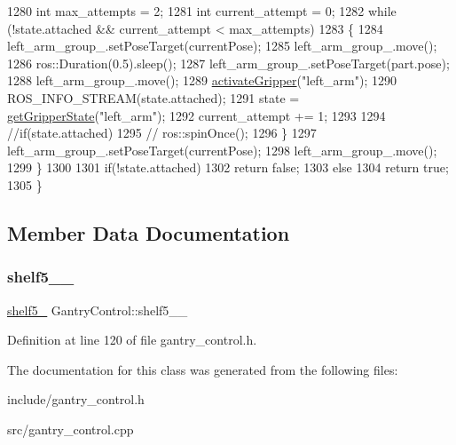 \begin{DoxyCode}
1280         \textcolor{keywordtype}{int} max\_attempts = 2;
1281         \textcolor{keywordtype}{int} current\_attempt = 0;
1282         \textcolor{keywordflow}{while} (!state.attached && current\_attempt < max\_attempts)
1283         \{
1284             left\_arm\_group\_.setPoseTarget(currentPose);
1285             left\_arm\_group\_.move();
1286             ros::Duration(0.5).sleep();
1287             left\_arm\_group\_.setPoseTarget(part.pose);
1288             left\_arm\_group\_.move();
1289             \hyperlink{classGantryControl_aaccd9c43b5564c198288ba51cbcecabe}{activateGripper}(\textcolor{stringliteral}{"left\_arm"});
1290             ROS\_INFO\_STREAM(state.attached);
1291             state = \hyperlink{classGantryControl_a986691834604135cf47b1c070f8d915e}{getGripperState}(\textcolor{stringliteral}{"left\_arm"});
1292             current\_attempt += 1;
1293 
1294             \textcolor{comment}{//if(state.attached)}
1295             \textcolor{comment}{// ros::spinOnce();}
1296         \}
1297         left\_arm\_group\_.setPoseTarget(currentPose);
1298         left\_arm\_group\_.move();
1299     \}
1300 
1301     \textcolor{keywordflow}{if}(!state.attached)
1302       \textcolor{keywordflow}{return} \textcolor{keyword}{false};
1303     \textcolor{keywordflow}{else}
1304       \textcolor{keywordflow}{return} \textcolor{keyword}{true};
1305 \}
\end{DoxyCode}


\subsection{Member Data Documentation}
\mbox{\label{classGantryControl_a6ff39df843c8d886e0dcc084414c8038}} 
\subsubsection{\texorpdfstring{shelf5\+\_\+\_\+}{shelf5\_4\_}}
{\footnotesize\ttfamily \hyperlink{structPresetLocation}{shelf5\+\_} Gantry\+Control\+::shelf5\+\_\+\_\+}



 

Definition at line 120 of file gantry\+\_\+control.\+h.



The documentation for this class was generated from the following files\+:\begin{DoxyCompactItemize}
\item 
include/gantry\+\_\+control.\+h\item 
src/gantry\+\_\+control.\+cpp\end{DoxyCompactItemize}
